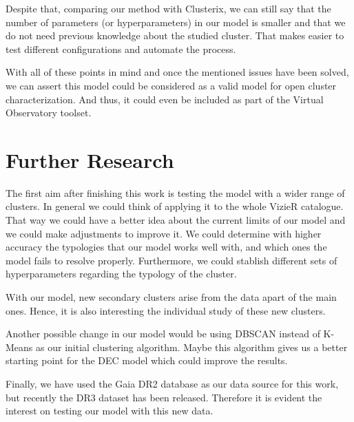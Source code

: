 \documentclass[11pt, a4paper, english]{book}
\begin{document}
Despite that, comparing our method with Clusterix,
we can still say that the number of parameters (or hyperparameters) in our model is smaller
and that we do not need previous knowledge about the studied cluster.
That makes easier to test different configurations and automate the process.

With all of these points in mind and once the mentioned issues have been solved,
we can assert this model could be considered as a valid model for open cluster characterization.
And thus, it could even be included as part of the Virtual Observatory toolset.

\section{Further Research}

The first aim after finishing this work is testing the model with a wider range of clusters.
In general we could think of applying it to the whole VizieR catalogue.
That way we could have a better idea about the current limits of our model and we could make adjustments to improve it.
We could determine with higher accuracy the typologies that our model works well with,
and which ones the model fails to resolve properly.
Furthermore, we could stablish different sets of hyperparameters regarding the typology of the cluster.

With our model, new secondary clusters arise from the data apart of the main ones.
Hence, it is also interesting the individual study of these new clusters.

Another possible change in our model would be using DBSCAN instead of K-Means as our initial clustering algorithm.
Maybe this algorithm gives us a better starting point for the DEC model which could improve the results.

Finally, we have used the Gaia DR2 database as our data source for this work,
but recently the DR3 dataset has been released.
Therefore it is evident the interest on testing our model with this new data.

\newpage




\end{document}
